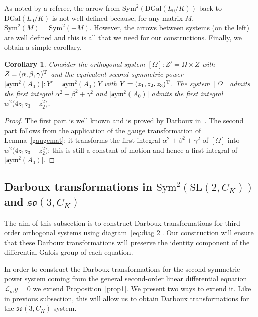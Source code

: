\documentclass[pdftex]{sigma}%
\numberwithin{equation}{section}
\newtheorem{Corollary}[Theorem]{Corollary}
\def\Sym{\mathrm{Sym}}
\def\sym{\mathfrak{s}\mathrm{y}\mathfrak{m}}
\begin{document}
As noted by a referee, the arrow from $\Sym^2 (\mathrm{DGal}(L_0/K)) $ back to $\mathrm{DGal}(L_0/K)$ is not well defined because, for any matrix $M$, $\Sym^2(M) = \Sym^2(-M)$. However, the arrows between systems (on the left) are well defined and this is all that we need for our constructions.
Finally, we obtain a simple corollary.
\begin{Corollary}%
Consider the orthogonal system $[\Omega]\colon Z' = \Omega \times Z$ with $Z = (\alpha , \beta , \gamma)^{\rm T}$ and the equivalent second symmetric power $\big[\sym^2 (A_0)\big]\colon Y' = \sym^2 (A_0) Y$ with $Y= (z_1, z_2 , z_3)^{\rm T}$. The system $[\Omega]$ admits the first integral $\alpha^2 + \beta^2 + \gamma^2$ and $\big[\sym^2 (A_0)\big]$ admits the first integral $w^2 \big(4 z_1 z_3 - z_2^2\big)$.
\end{Corollary}

\begin{proof}The first part is well known and is proved by Darboux in~\cite[Part~I, Chapter~I, p.~8 and Chapter~II, p.~28]{da3}.
The second part follows from the application of the gauge transformation of Lemma~\ref{gaugemat}: it transforms the first integral $\alpha^2 + \beta^2 + \gamma^2$ of $[\Omega]$ into $w^2 \big(4 z_1 z_3 - z_2^2\big)$:
this is still a constant of motion and hence a first integral of $\big[\sym^2 (A_0)\big]$.
\end{proof}

\subsection{Darboux transformations in \texorpdfstring{$\Sym^2(\mathrm{SL}(2,C_K))$}{Sym\string^2(SL(2,C\_K))} and \texorpdfstring{$\mathfrak{so}(3,C_K)$}{so(3,C\_K)}}

The aim of this subsection is to construct Darboux transformations for third-order orthogonal systems using diagram~\eqref{eq:diag 2}.
Our construction will ensure that these Darboux transformations will preserve the identity component of the differential Galois group of each equation.

In order to construct the Darboux transformations for the second symmetric power system coming from the general second-order linear differential equation ${\mathcal{L}}_my=0$ we extend Proposition~\ref{prop1}. We present two ways to extend it. Like in previous subsection, this will allow us to obtain Darboux transformations for the $\mathfrak{so}(3, C_K)$ system.
\end{document}
